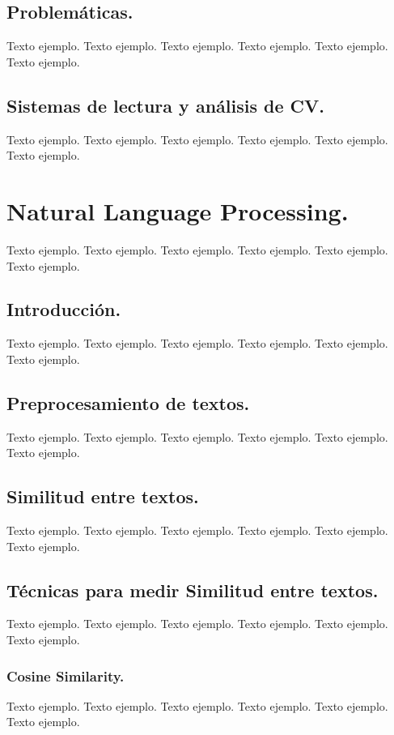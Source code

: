 \documentclass[12pt,a4paper]{article}
\begin{document}
\subsection{Problemáticas.}
Texto ejemplo. Texto ejemplo. Texto ejemplo. Texto ejemplo. Texto ejemplo. Texto ejemplo.

\subsection{Sistemas de lectura y análisis de CV.}
Texto ejemplo. Texto ejemplo. Texto ejemplo. Texto ejemplo. Texto ejemplo. Texto ejemplo.

\section{Natural Language Processing.}
Texto ejemplo. Texto ejemplo. Texto ejemplo. Texto ejemplo. Texto ejemplo. Texto ejemplo.

\subsection{Introducción.}
Texto ejemplo. Texto ejemplo. Texto ejemplo. Texto ejemplo. Texto ejemplo. Texto ejemplo.

\subsection{Preprocesamiento de textos.}
Texto ejemplo. Texto ejemplo. Texto ejemplo. Texto ejemplo. Texto ejemplo. Texto ejemplo.

\subsection{Similitud entre textos.}
Texto ejemplo. Texto ejemplo. Texto ejemplo. Texto ejemplo. Texto ejemplo. Texto ejemplo.

\subsection{Técnicas para medir Similitud entre textos.}
Texto ejemplo. Texto ejemplo. Texto ejemplo. Texto ejemplo. Texto ejemplo. Texto ejemplo.

\subsubsection{Cosine Similarity.}
Texto ejemplo. Texto ejemplo. Texto ejemplo. Texto ejemplo. Texto ejemplo. Texto ejemplo.
\end{document}
